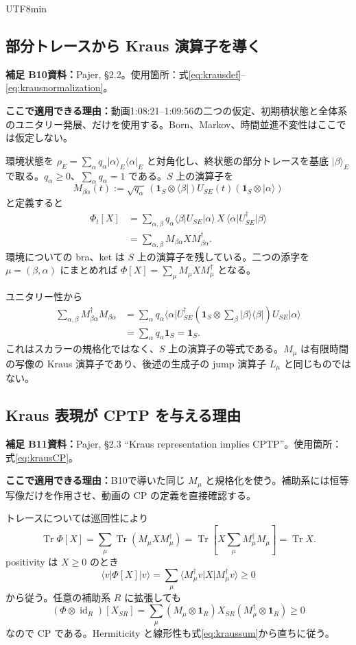\documentclass[11pt,a4paper]{article}
\numberwithin{equation}{section}
\newcommand{\Tr}{\operatorname{Tr}}
\newcommand{\id}{\operatorname{id}}
\newcommand{\I}{\mathbf{1}}
\newcommand{\ket}[1]{\lvert#1\rangle}
\newcommand{\bra}[1]{\langle#1\rvert}
\newcommand{\supp}[3]{\par\smallskip\noindent\textcolor{BrickRed}{\textbf{補足 #1}}\quad\textbf{資料：}#2\par\noindent\textbf{ここで適用できる理由：}#3\par}
\begin{document}
\begin{CJK*}{UTF8}{min}
\subsection{部分トレースから Kraus 演算子を導く}
\supp{B10}{Pajer\cite{pajer}, §2.2。使用箇所：式\eqref{eq:krausdef}--\eqref{eq:krausnormalization}。}{動画1:08:21--1:09:56の二つの仮定、初期積状態と全体系のユニタリー発展、だけを使用する。Born、Markov、時間並進不変性はここでは仮定しない。}
環境状態を $\rho_E=\sum_\alpha q_\alpha\ket{\alpha}_E\bra{\alpha}_E$ と対角化し、終状態の部分トレースを基底 $\ket{\beta}_E$ で取る。$q_\alpha\geq0$、$\sum_\alpha q_\alpha=1$ である。$S$ 上の演算子を
\begin{equation}
M_{\beta\alpha}(t):=\sqrt{q_\alpha}\,
(\I_S\otimes\bra{\beta})U_{SE}(t)(\I_S\otimes\ket{\alpha})
\label{eq:krausdef}
\end{equation}
と定義すると
\begin{align}
\Phi_t[X]
&=\sum_{\alpha,\beta}q_\alpha
\bra{\beta}U_{SE}\ket{\alpha}\,X\,
\bra{\alpha}U_{SE}^\dagger\ket{\beta}\nonumber\\
&=\sum_{\alpha,\beta}M_{\beta\alpha}X M_{\beta\alpha}^\dagger.
\label{eq:kraussum}
\end{align}
環境についての bra、ket は $S$ 上の演算子を残している。二つの添字を $\mu=(\beta,\alpha)$ にまとめれば $\Phi[X]=\sum_\mu M_\mu XM_\mu^\dagger$ となる。

ユニタリー性から
\begin{align}
\sum_{\alpha,\beta}M_{\beta\alpha}^\dagger M_{\beta\alpha}
&=\sum_\alpha q_\alpha\bra{\alpha}U_{SE}^\dagger
\left(\I_S\otimes\sum_\beta\ket{\beta}\bra{\beta}\right)
U_{SE}\ket{\alpha}\nonumber\\
&=\sum_\alpha q_\alpha\I_S=\I_S.
\label{eq:krausnormalization}
\end{align}
これはスカラーの規格化ではなく、$S$ 上の演算子の等式である。$M_\mu$ は有限時間の写像の Kraus 演算子であり、後述の生成子の jump 演算子 $L_\mu$ と同じものではない。

\subsection{Kraus 表現が CPTP を与える理由}
\supp{B11}{Pajer\cite{pajer}, §2.3 ``Kraus representation implies CPTP''。使用箇所：式\eqref{eq:krausCP}。}{B10で導いた同じ $M_\mu$ と規格化を使う。補助系には恒等写像だけを作用させ、動画の CP の定義を直接確認する。}
トレースについては巡回性により
\begin{equation}
\Tr\Phi[X]=\sum_\mu\Tr(M_\mu XM_\mu^\dagger)
=\Tr\!\left[X\sum_\mu M_\mu^\dagger M_\mu\right]=\Tr X.
\end{equation}
positivity は $X\geq0$ のとき
\begin{equation}
\bra{v}\Phi[X]\ket{v}
=\sum_\mu\bra{M_\mu^\dagger v}X\ket{M_\mu^\dagger v}\geq0
\end{equation}
から従う。任意の補助系 $R$ に拡張しても
\begin{equation}
(\Phi\otimes\id_R)[X_{SR}]
=\sum_\mu(M_\mu\otimes\I_R)X_{SR}(M_\mu^\dagger\otimes\I_R)\geq0
\label{eq:krausCP}
\end{equation}
なので CP である。Hermiticity と線形性も式\eqref{eq:kraussum}から直ちに従う。


\end{CJK*}
\end{document}
